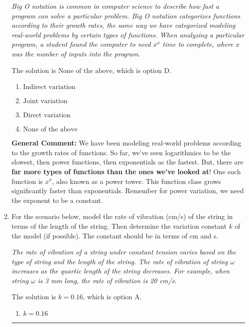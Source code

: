 \documentclass{extbook}[14pt]
\newcommand{\litem}[1]{\item #1

\rule{\textwidth}{0.4pt}}
\begin{document}
\begin{enumerate}
{\begin{center}
    \textit{ Big O notation is common in computer science to describe how fast a program can solve a particular problem. Big O notation categorizes functions according to their growth rates, the same way we have categorized modeling real-world problems by certain types of functions. When analyzing a particular program, a student found the computer to need $x^x$ time to complete, where $x$ was the number of inputs into the program. }
\end{center}
The solution is \( \text{None of the above} \), which is option D.\begin{enumerate}[label=\Alph*.]
\item \( \text{Indirect variation} \)


\item \( \text{Joint variation} \)


\item \( \text{Direct variation} \)


\item \( \text{None of the above} \)


\end{enumerate}

\textbf{General Comment:} We have been modeling real-world problems according to the growth rates of functions. So far, we've seen logarithmics to be the slowest, then power functions, then exponentials as the fastest. But, there are \textbf{far more types of functions than the ones we've looked at}! One such function is $x^x$, also known as a power tower. This function class grows significantly faster than exponentials. Remember for power variation, we need the exponent to be a constant.
}
\litem{
For the scenario below, model the rate of vibration (cm/s) of the string in terms of the length of the string. Then determine the variation constant $k$ of the model (if possible). The constant should be in terms of cm and s.

\begin{center}
    \textit{ The rate of vibration of a string under constant tension varies based on the type of string and the length of the string. The rate of vibration of string $\omega$ increases as the quartic length of the string decreases. For example, when string $\omega$ is 3 mm long, the rate of vibration is 20 cm/s. }
\end{center}
The solution is \( k = 0.16 \), which is option A.\begin{enumerate}[label=\Alph*.]
\item \( k = 0.16 \)


\end{enumerate}}
\end{enumerate}
\end{document}
